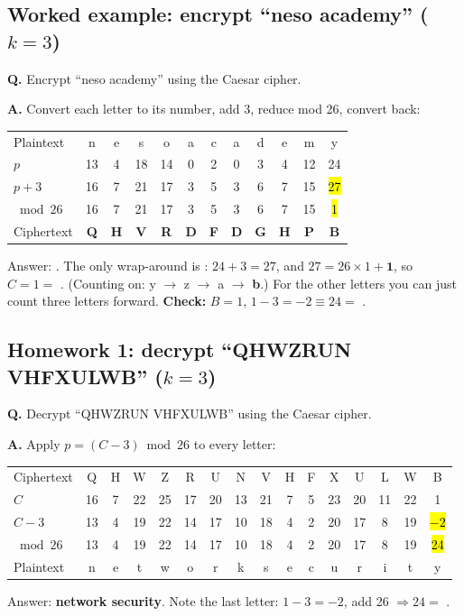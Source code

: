 \subsection{Worked example: encrypt ``neso academy'' ($k=3$)}
\begin{worked}
\textbf{Q.} Encrypt ``neso academy'' using the Caesar cipher.

\textbf{A.} Convert each letter to its number, add 3, reduce mod 26, convert back:
\begin{center}\small\setlength{\tabcolsep}{5pt}
\begin{tabular}{@{}l*{4}{c}|*{7}{c}@{}}
\toprule
Plaintext & n&e&s&o & a&c&a&d&e&m&y\\
$p$ & 13&4&18&14 & 0&2&0&3&4&12&24\\
$p+3$ & 16&7&21&17 & 3&5&3&6&7&15&\hl{27}\\
$\bmod 26$ & 16&7&21&17 & 3&5&3&6&7&15&\hl{1}\\
Ciphertext & \textbf{Q}&\textbf{H}&\textbf{V}&\textbf{R} & \textbf{D}&\textbf{F}&\textbf{D}&\textbf{G}&\textbf{H}&\textbf{P}&\textbf{B}\\
\bottomrule
\end{tabular}
\end{center}
Answer: \textbf{}.
The only wrap-around is : $24+3 = 27$, and $27 = 26\times 1 + \mathbf{1}$, so $C = 1 = $ .
(Counting on: y $\to$ z $\to$ a $\to$ \textbf{b}.) For the other letters you can just count three letters forward.
\textbf{Check:} $B = 1$, $1 - 3 = -2 \equiv 24 = $  \checkmark.
\end{worked}

\subsection{Homework 1: decrypt ``QHWZRUN VHFXULWB'' ($k=3$)}
\begin{worked}
\textbf{Q.} Decrypt ``QHWZRUN VHFXULWB'' using the Caesar cipher.

\textbf{A.} Apply $p = (C - 3) \bmod 26$ to every letter:
\begin{center}\small\setlength{\tabcolsep}{3.6pt}
\begin{tabular}{@{}l*{7}{c}|*{8}{c}@{}}
\toprule
Ciphertext & Q&H&W&Z&R&U&N & V&H&F&X&U&L&W&B\\
$C$ & 16&7&22&25&17&20&13 & 21&7&5&23&20&11&22&1\\
$C-3$ & 13&4&19&22&14&17&10 & 18&4&2&20&17&8&19&\hl{$-2$}\\
$\bmod 26$ & 13&4&19&22&14&17&10 & 18&4&2&20&17&8&19&\hl{24}\\
Plaintext & n&e&t&w&o&r&k & s&e&c&u&r&i&t&y\\
\bottomrule
\end{tabular}
\end{center}
Answer: \textbf{network security}. Note the last letter: $1-3=-2$, add 26 $\Rightarrow 24 =$ .
\end{worked}

